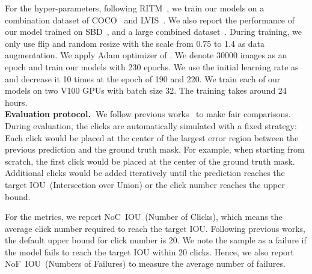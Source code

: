\documentclass[10pt,twocolumn,letterpaper]{article}
\begin{document}
For the hyper-parameters, following RITM~\cite{sofiiuk2021ritm}, we train our models on a combination dataset of COCO~\cite{lin2014coco} and LVIS~\cite{gupta2019lvis}. We also report the performance of our model trained on SBD~\cite{SBD}, and a large combined dataset~\cite{lin2014coco,gupta2019lvis,borji2015msra10k,ade20k,wang2017learningduts,xu2018youtubevos,thinobject,cong2020dovenet}.
During training, we only use flip and random resize with the scale from 0.75 to 1.4 as data augmentation.  We apply Adam optimizer of . We denote 30000 images as an epoch and train our models with 230 epochs. We use the initial learning rate as  and decrease it 10 times at the epoch of 190 and 220. We train each of our models on two V100 GPUs with batch size 32. The training takes around 24 hours. \\




\noindent \textbf{Evaluation protocol.~}We follow previous works~\cite{xu2016deep,chen2021cdnet,sofiiuk2021ritm,jang2019brs,fbrs,firstclick} to make fair comparisons. During evaluation, the clicks are automatically simulated with a fixed strategy:  Each click would be placed at the center of the largest error region between the previous prediction and the ground truth mask. For example, when starting from scratch, the first click would be placed at the center of the ground truth mask. Additional clicks would be added iteratively until the prediction reaches the target IOU~(Intersection over Union) or the click number reaches the upper bound.    

For the metrics, we report NoC~IOU~(Number of Clicks), which means the average click number required to reach the target IOU. Following previous works, the default upper bound for click number is 20. We note the sample as a failure if the model fails to reach the target IOU within 20 clicks. Hence, we also report NoF~IOU~(Numbers of Failures) to measure the average number of failures. 
\end{document}
